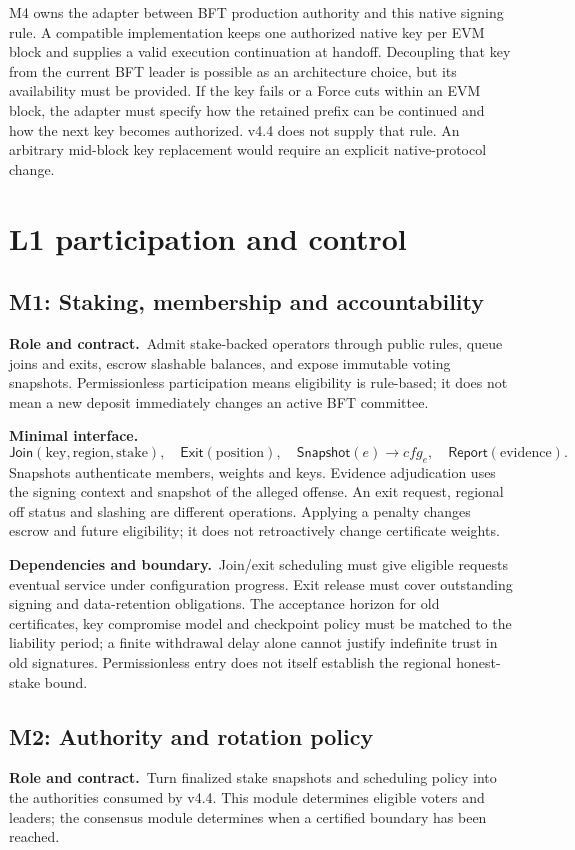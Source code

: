 \documentclass[11pt,a4paper]{article}
\newcommand{\api}[1]{\ensuremath{\mathsf{#1}}}
\newcommand{\role}{\textbf{Role and contract.}\ }
\newcommand{\iface}{\textbf{Minimal interface.}\ }
\newcommand{\depends}{\textbf{Dependencies and boundary.}\ }
\begin{document}
M4 owns the adapter between BFT production authority and this native
signing rule. A compatible implementation keeps one authorized native
key per EVM block and supplies a valid execution continuation at handoff.
Decoupling that key from the current BFT leader is possible as an
architecture choice, but its availability must be provided. If the key
fails or a Force cuts within an EVM block, the adapter must specify how
the retained prefix can be continued and how the next key becomes
authorized. v4.4 does not supply that rule. An arbitrary mid-block key
replacement would require an explicit native-protocol change.

\section{L1 participation and control}\label{sec:l1}
\subsection{M1: Staking, membership and accountability}\label{sec:staking}
\role Admit stake-backed operators through public rules, queue joins and
exits, escrow slashable balances, and expose immutable voting snapshots.
Permissionless participation means eligibility is rule-based; it does not
mean a new deposit immediately changes an active BFT committee.

\iface
\[
 \api{Join}(\text{key},\text{region},\text{stake}),\quad
 \api{Exit}(\text{position}),\quad
 \api{Snapshot}(e)\to\mathit{cfg}_e,\quad
 \api{Report}(\text{evidence}).
\]
Snapshots authenticate members, weights and keys. Evidence adjudication
uses the signing context and snapshot of the alleged offense. An exit
request, regional off status and slashing are different operations.
Applying a penalty changes escrow and future eligibility; it does not
retroactively change certificate weights.

\depends Join/exit scheduling must give eligible requests eventual
service under configuration progress. Exit release must cover outstanding
signing and data-retention obligations. The acceptance horizon for old
certificates, key compromise model and checkpoint policy must be matched
to the liability period; a finite withdrawal delay alone cannot justify
indefinite trust in old signatures. Permissionless entry does not itself
establish the regional honest-stake bound.

\subsection{M2: Authority and rotation policy}\label{sec:authority}
\role Turn finalized stake snapshots and scheduling policy into the
authorities consumed by v4.4. This module determines eligible voters and
leaders; the consensus module determines when a certified boundary has
been reached.
\end{document}
